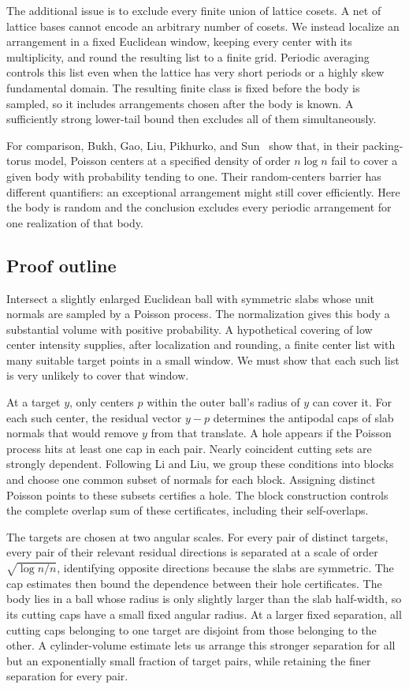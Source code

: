The additional issue is to exclude every finite union of lattice cosets.
A net of lattice bases cannot encode an arbitrary number of cosets. We
instead localize an arrangement in a fixed Euclidean window, keeping every
center with its multiplicity, and round the resulting list to a finite grid.
Periodic averaging controls this list even when the lattice has very short
periods or a highly skew fundamental domain. The resulting finite class is
fixed before the body is sampled, so it includes arrangements chosen after
the body is known. A sufficiently strong lower-tail bound then excludes
all of them simultaneously.

For comparison, Bukh, Gao, Liu, Pikhurko, and Sun~\cite[Theorem~1.3]{BukhEtAl2025Random}
show that, in their packing-torus model, Poisson centers at a specified
density of order $n\log n$ fail to cover a given body with probability
tending to one.
Their random-centers barrier has different quantifiers: an exceptional arrangement might still
cover efficiently. Here the body is random and the conclusion excludes
every periodic arrangement for one realization of that body.

\subsection{Proof outline}

Intersect a slightly enlarged Euclidean ball with symmetric slabs whose unit
normals are sampled by a Poisson process.
The normalization gives this body a substantial volume with positive
probability. A hypothetical covering of low center intensity supplies,
after localization and rounding, a finite center list with many suitable
target points in a small window. We must show that each such list is very
unlikely to cover that window.

At a target $y$, only centers $p$ within the outer ball's radius of $y$
can cover it. For each such center, the residual vector $y-p$ determines
the antipodal caps of slab normals that would remove $y$ from that
translate. A hole appears if the Poisson process hits at least one cap
in each pair. Nearly coincident cutting sets are strongly dependent.
Following Li and Liu, we group these conditions into blocks and choose one common subset of normals
for each block. Assigning distinct Poisson points to these subsets certifies
a hole. The block construction controls the complete overlap sum of these
certificates, including their self-overlaps.

The targets are chosen at two angular scales. For every pair of distinct
targets, every pair of their relevant residual directions is separated
at a scale of order $\sqrt{\log n/n}$, identifying opposite directions
because the slabs are symmetric. The cap estimates then bound the
dependence between their hole certificates. The body lies in a ball
whose radius is only slightly larger than the slab half-width, so its
cutting caps have a small fixed angular radius. At a larger fixed
separation, all cutting caps belonging to one target are disjoint from
those belonging to the other. A cylinder-volume estimate lets us arrange
this stronger separation for all but an exponentially small fraction of
target pairs, while retaining the finer separation for every pair.

